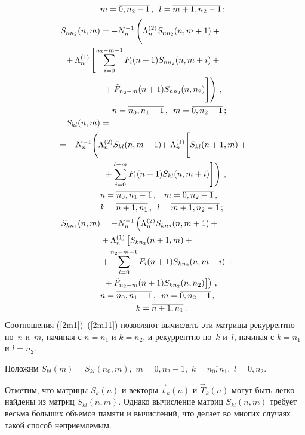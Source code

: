 \begin{multicols}{2}
\begin{align}
& m=\overline{0,n_2-1}\,,
\enskip l=\overline{m+1,n_2-1}\,;
\\
\label{2m9}
S_{nn_2}(n,m) &=
-N_{n}^{-1}
\left(
\vphantom{\sum\limits_{i=0}^{l-m}}
\Lambda^{(2)}_{n} S_{nn_2}(n,m+1) +{}\right.\notag\\
&\hspace*{-15mm}{}+ \Lambda^{(1)}_{n}
\left[
\sum_{i=0}^{n_2-m-1} F_i(n+1) S_{nn_2}(n,m+i) +{}\right.\notag\\
&\left.\left.{}+\tilde F_{n_2-m}(n+1) S_{nn_2}(n,n_2)
\vphantom{\sum\limits_i^l}
\right]
\right)
\,,\notag\\
&\hspace*{5mm}n=\overline{n_0,n_1-1}\,,
\enskip  m=\overline{0,n_2-1}\,;
\\
\label{2m10}
S_{kl}(n,m) &=\notag\\
&\hspace*{-18mm}{}=-N_{n}^{-1}\!
\left( \vphantom{\sum\limits_i^l}
\Lambda^{(2)}_{n} S_{kl}(n,m+1) +\right.
\Lambda^{(1)}_{n}\!
\left[\vphantom{\sum\limits_i^k}
S_{kl}(n+1,m) +{}\right.\notag\\
&\left.\left.{}+ \sum_{i=0}^{l-m} F_i(n+1) S_{kl}(n,m+i)
\right ]
\right )
\,,\notag\\
&n=\overline{n_0,n_1-1}\,,
\enskip \ m=\overline{0,n_2-1}\,,\notag\\
&k=\overline{n+1,n_1}\,,
\enskip l=\overline{m+1,n_2-1}\,;
\\
\label{2m11}
S_{kn_2}(n,m) &=
-N_{n}^{-1}
\left(
\Lambda^{(2)}_{n} S_{kn_2}(n,m+1) +{}\right.\notag\\
&{}+ \Lambda^{(1)}_{n}
\left[ \vphantom{\tilde{F}_{n_2}}
S_{kn_2}(n+1,m) +{}\right.\notag\\
&{}+ \sum_{i=0}^{n_2-m-1} F_i(n+1) S_{kn_2}(n,m+i) +{}\notag\\
&\left.\left.{}+
\tilde F_{n_2-m}(n+1) S_{kn_2}(n,n_2)
\right]
\right)
\,,\notag\\
& n=\overline{n_0,n_1-1}\,,
\enskip m=\overline{0,n_2-1}\,,\notag\\
&\hspace*{15mm} k=\overline{n+1,n_1}\,.
\end{align}
Соотношения (\ref{2m1})--(\ref{2m11}) позволяют вычислять
эти матрицы рекуррентно по~$n$ и~$m$, начиная
с $n=n_1$ и $k=n_2$, и рекуррентно по~$k$ и~$l$, начиная
с $k=n_1$ и $l=n_2$.

Положим $S_{kl}(m) = S_{kl}(n_0,m)$,\  $m=\overline{0,n_2-1}$,\ 
$k=\overline{n_0,n_1}$,\ $l=\overline{0,n_2}$.

Отметим, что матрицы $S_k(n)$ и векторы $\vec t_k(n)$ и $\vec T_k(n)$
могут быть легко найдены из матриц $S_{kl}(n,m)$.
Однако вычисление матриц $S_{kl}(n,m)$ требует весьма больших объемов
памяти и вычислений, что делает во многих случаях такой способ
неприемлемым.


\end{multicols}
